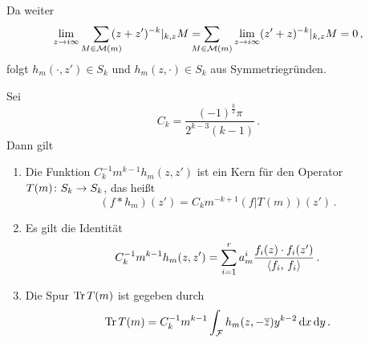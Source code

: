Da weiter
\begin{align*}
\lim_{z \to i\infty} \smashoperator[r]{\sum_{M \in \M(m)}} \, (z+z')^{-k}|_{k,z} M
= \smashoperator[l]{\sum_{M \in \M(m)}} \lim_{z \to i\infty} (z'+z)^{-k}|_{k,z} M
= 0\,,
\end{align*}
folgt $h_m(\cdot, z') \in S_k$ und $h_m(z, \cdot) \in S_k$ aus Symmetriegründen.


\begin{satz}\label{analytischeSpurformel}
	Sei
	\begin{equation}%
	C_k = \frac{(-1)^{\frac{k}{2}} \pi}{2^{k-3}(k-1)}\,.
	\end{equation}
	Dann gilt
	\begin{enumerate}
		\item Die Funktion $C_k^{-1} m^{k-1} h_m(z,z')$ ist ein Kern für den Operator $T(m)\colon S_k \rightarrow S_k$, das heißt
		\begin{equation}\label{eq:faltung_hm}%
		(f * h_m)(z') = C_km^{-k+1} (f|T(m))(z')
		\,.
		\end{equation}
		\item Es gilt die Identität 
		\begin{equation}%
		C_k^{-1} m^{k-1} h_m(z,z') = \sum_{i=1}^r a_m^i \frac{f_i(z) \cdot f_i(z')}{\scalarprd{f_i}{f_i}}
		\,.
		\end{equation}
		\item Die Spur $\operatorname{Tr} T(m)$ ist gegeben durch
		\begin{equation}%
		\Tr T(m) = C_k^{-1} m^{k-1} \int_\F h_m(z, -\conj z) y^{k-2} \opd x \opd y
		\,.
		\end{equation}
	\end{enumerate}
\end{satz}

